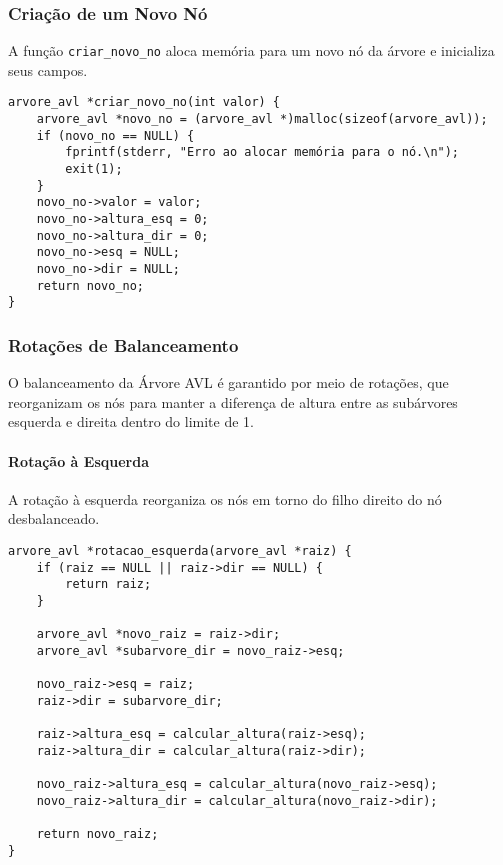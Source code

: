 \subsubsection{Criação de um Novo Nó}

A função \texttt{criar\_novo\_no} aloca memória para um novo nó da árvore e inicializa seus campos.

\begin{verbatim}
arvore_avl *criar_novo_no(int valor) {
    arvore_avl *novo_no = (arvore_avl *)malloc(sizeof(arvore_avl));
    if (novo_no == NULL) {
        fprintf(stderr, "Erro ao alocar memória para o nó.\n");
        exit(1);
    }
    novo_no->valor = valor;
    novo_no->altura_esq = 0;
    novo_no->altura_dir = 0;
    novo_no->esq = NULL;
    novo_no->dir = NULL;
    return novo_no;
}
\end{verbatim}

\subsubsection{Rotações de Balanceamento}

O balanceamento da Árvore AVL é garantido por meio de rotações,
que reorganizam os nós para manter a diferença de altura entre as subárvores esquerda e direita dentro do limite de 1.

\paragraph{Rotação à Esquerda}  
A rotação à esquerda reorganiza os nós em torno do filho direito do nó desbalanceado.

\begin{verbatim}
arvore_avl *rotacao_esquerda(arvore_avl *raiz) {
    if (raiz == NULL || raiz->dir == NULL) {
        return raiz;
    }
      
    arvore_avl *novo_raiz = raiz->dir;
    arvore_avl *subarvore_dir = novo_raiz->esq;
      
    novo_raiz->esq = raiz;
    raiz->dir = subarvore_dir;
      
    raiz->altura_esq = calcular_altura(raiz->esq);
    raiz->altura_dir = calcular_altura(raiz->dir);
      
    novo_raiz->altura_esq = calcular_altura(novo_raiz->esq);
    novo_raiz->altura_dir = calcular_altura(novo_raiz->dir);
      
    return novo_raiz;
}
\end{verbatim}

